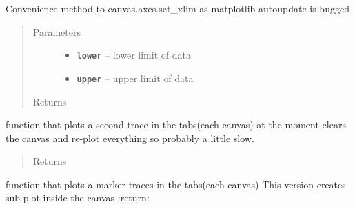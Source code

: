 \documentclass[letterpaper,10pt,english]{sphinxmanual}
\begin{document}
\begin{fulllineitems}
\begin{fulllineitems}
\end{fulllineitems}


\begin{fulllineitems}
\label{Cormat_main:Cormat_main.CORMAT_GUI.set_xlimits}
Convenience method to canvas.axes.set\_xlim
as matplotlib autoupdate is bugged
\begin{quote}\begin{description}
\item[{Parameters}] \leavevmode\begin{itemize}
\item {} 
\textbf{\texttt{lower}} -- lower limit of data

\item {} 
\textbf{\texttt{upper}} -- upper limit of data

\end{itemize}

\item[{Returns}] \leavevmode


\end{description}\end{quote}

\end{fulllineitems}


\begin{fulllineitems}
\label{Cormat_main:Cormat_main.CORMAT_GUI.plot_2nd_trace}
function that plots a second trace in the tabs(each canvas)
at the moment clears the canvas and re-plot everything
so probably a little slow.
\begin{quote}\begin{description}
\item[{Returns}] \leavevmode


\end{description}\end{quote}

\end{fulllineitems}


\begin{fulllineitems}
\label{Cormat_main:Cormat_main.CORMAT_GUI.plot_markers}
function that plots a marker traces in the tabs(each canvas)
This version creates sub plot inside the canvas
:return:


\end{fulllineitems}
\end{fulllineitems}
\end{document}
